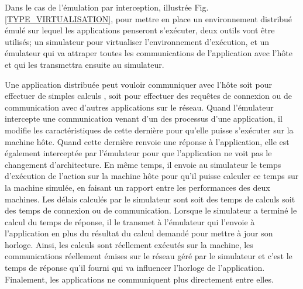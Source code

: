 Dans le cas de l'émulation par interception, illustrée
Fig.\ref{TYPE_VIRTUALISATION}, pour mettre en place un environnement distribué
émulé sur lequel les applications penseront s'exécuter, deux outils vont être
utilisés; un simulateur pour virtualiser l'environnement d'exécution, et un
émulateur qui va attraper toutes les communications de l'application avec l'hôte
et qui les transmettra ensuite au simulateur.

 Une application distribuée peut vouloir communiquer avec l'hôte soit pour
 effectuer de simples calculs %
 , soit pour effectuer des requêtes de
 connexion ou de communication avec d'autres applications sur le réseau. Quand
 l'émulateur intercepte une communication venant d'un des processus d'une
 application, il modifie les caractéristiques de cette dernière pour qu'elle
 puisse s'exécuter sur la machine hôte. Quand cette dernière renvoie une réponse
 à l'application, elle est également interceptée par l'émulateur pour que
 l'application ne voit pas le changement d'architecture. En même temps, il
 envoie au simulateur le temps d'exécution de l'action sur la machine hôte pour
 qu'il puisse calculer ce temps sur la machine simulée, en faisant un rapport
 entre les performances des deux machines. Les délais calculés par le simulateur
 sont soit des temps de calculs soit des temps de connexion ou de
 communication. Lorsque le simulateur a terminé le calcul du temps de réponse,
 il le transmet à l'émulateur qui l'envoie à l'application en plus du résultat
 du calcul demandé pour mettre à jour son horloge. Ainsi, les calculs sont
 réellement exécutés sur la machine, les communications réellement émises sur le
 réseau géré par le simulateur et c'est le temps de réponse qu'il fourni qui va
 influencer l'horloge de l'application. Finalement, les applications ne
 communiquent plus directement entre elles.

